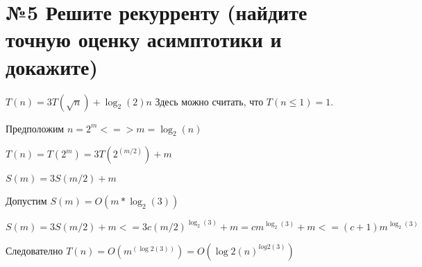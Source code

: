 
\section*{№5 Решите рекурренту (найдите точную оценку асимптотики и докажите)}

$T(n) = 3 T(\sqrt{n}) + \log_{2}(2) n$ Здесь можно считать, что $T(n \le 1) = 1$.


Предположим $n = 2^m <=> m = \log_{2}(n)$

$T(n) = T(2^m) = 3T(2^(m/2))+m$

$S(m) = 3S(m/2)+m$

Допустим $S(m) = O(m*\log_{2}(3))$

$S(m) = 3S(m/2)+m <= 3c(m/2)^{\log_{2}(3)}+m = cm^{\log_{2}(3)}+m<= (c+1)m^{\log_{2}(3)}$


Следователно $ T(n) = O(m^(\log{2}(3))) = O(\log{2}(n)^{log{2}(3)})$